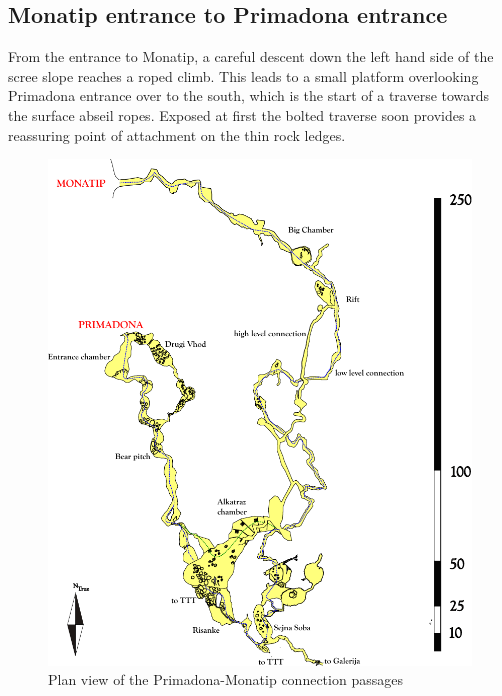 \subsection{Monatip entrance to Primadona entrance}
From the entrance to Monatip, a careful descent down the left hand side of the scree slope reaches a roped climb. This leads to a small platform overlooking Primadona entrance over to the south, which is the start of a traverse towards the surface abseil ropes. Exposed at first  the bolted traverse soon provides a reassuring point of attachment on the thin rock ledges.


\begin{figure}[t!]
\centering
\includegraphics[height=\textheight]{images/pdf_maps/prima-mona-trip.pdf}
\caption{Plan view of the Primadona-Monatip connection passages}
\label{prima mona trip}
\end{figure}
